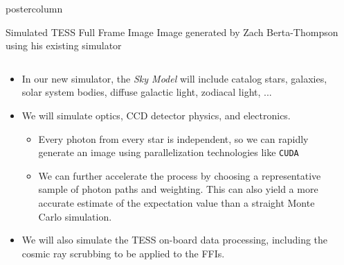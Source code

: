 \documentclass[final,hyperref={pdfpagelabels=false}]{beamer}
\newlength{\columnheight}
\begin{document}
\begin{frame}
\begin{columns}
    \begin{column}{.49\textwidth}
      \begin{beamercolorbox}[center,wd=\textwidth]{postercolumn}
        \begin{minipage}[T]{.95\textwidth}
          \parbox[t][\columnheight]{\textwidth}{
            \begin{block}{Simulated TESS Full Frame Image}
            Image generated by Zach Berta-Thompson using his existing simulator
              \begin{columns}
                \begin{column}{.60\textwidth}
                \begin{itemize}
                    \item In our new simulator, the \emph{Sky Model} will include catalog stars, galaxies, solar system bodies, diffuse galactic light, zodiacal light, ...
                    \vfill
                    \item We will simulate optics, CCD detector physics, and electronics.
                    \begin{itemize}
                    	\item Every photon from every star is independent, so we can rapidly generate an image using parallelization technologies like \texttt{CUDA} 
			\item We can further accelerate the process by choosing a representative sample of photon paths and weighting. This can also yield a more accurate estimate of the expectation value than a straight Monte Carlo simulation.
                    \end{itemize}
                    \vfill
                    \item We will also simulate the TESS on-board data processing, including the cosmic ray scrubbing to be applied to the FFIs.
                    \vfill
                \end{itemize}
                \end{column}
                \begin{column}{.38\textwidth}

\end{column}
\end{columns}
\end{block}}
\end{minipage}
\end{beamercolorbox}
\end{column}
\end{columns}
\end{frame}
\end{document}
